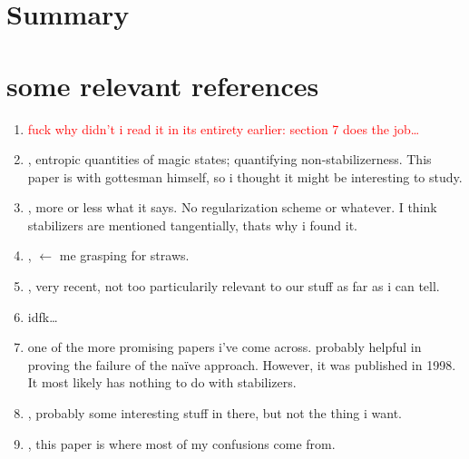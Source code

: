 \section{Summary}

\clearpage
\section{some relevant references}
\begin{enumerate}
  \item \textcolor{red}{
      fuck why didn't i read it in its entirety earlier: section 7 does the
    job\ldots}
  \item {}, entropic quantities of
    magic states; quantifying non-stabilizerness. This paper is with gottesman
    himself, so i thought it might be interesting to study. 
  \item {}, more or less what
    it says. No regularization scheme or whatever. I think stabilizers are
    mentioned tangentially, thats why i found it.
  \item {}, $\leftarrow$ me
    grasping for straws.
  \item {}, very recent, not too
    particularily relevant to our stuff as far as i can tell.
  \item {} idfk\ldots
  \item {} one of the more
    promising papers i've come across. probably helpful in proving the failure
    of the na\"ive approach. However, it was published in 1998. It most likely
    has nothing to do with stabilizers.
  \item {}, probably some interesting
    stuff in there, but not the thing i want.
  \item {}, this paper is where most
    of my confusions come from. 
\end{enumerate}
